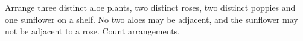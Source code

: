 Arrange three distinct aloe plants, two distinct roses, two distinct poppies and one sunflower on a shelf. No two aloes may be adjacent, and the sunflower may not be adjacent to a rose. Count arrangements.
